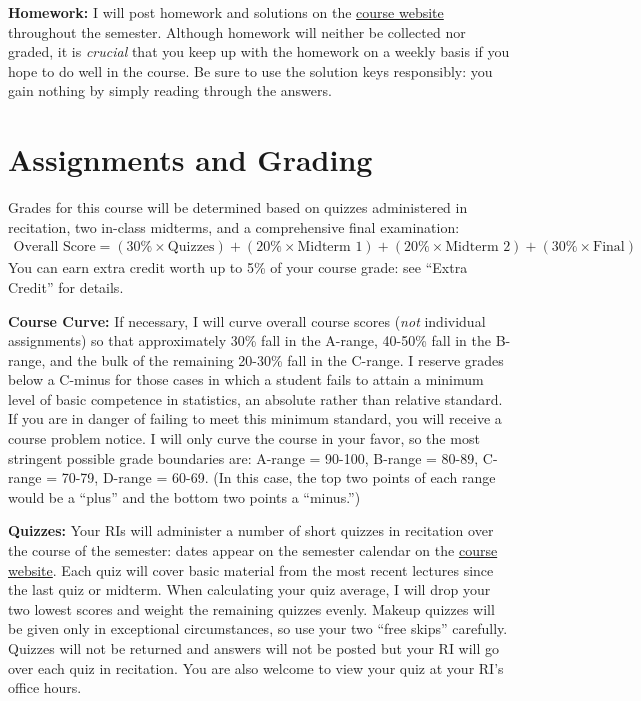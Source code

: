 \documentclass[11pt, letterpaper]{article}
\begin{document}
\medskip

\noindent \textbf{Homework:} 
I will post homework and solutions on the \href{http://ditraglia.com/Econ103Public}{course website} throughout the semester. 
Although homework will neither be collected nor graded, it is \emph{crucial} that you keep up with the homework on a weekly basis if you hope to do well in the course.
Be sure to use the solution keys responsibly: you gain nothing by simply reading through the answers.



\section*{Assignments and Grading}

Grades for this course will be determined based on quizzes administered in recitation, two in-class midterms, and a comprehensive final examination:
	\begin{equation*}
	\begin{split}
		\mbox{Overall Score} = (30\% \times \mbox{Quizzes})  + (20\% \times \mbox{Midterm 1}) + (20\% \times \mbox{Midterm 2}) + (30\% \times \mbox{Final})
	\end{split}
	\end{equation*}
You can earn extra credit worth up to 5\% of your course grade: see ``Extra Credit'' for details.

\medskip 

\noindent \textbf{Course Curve:}
If necessary, I will curve overall course scores (\emph{not} individual assignments) so that approximately 30\% fall in the A-range, 40-50\% fall in the B-range, and the bulk of the remaining 20-30\% fall in the C-range. 
I reserve grades below a C-minus for those cases in which a student fails to attain a minimum level of basic competence in statistics, an absolute rather than relative standard. 
If you are in danger of failing to meet this minimum standard, you will receive a course problem notice.
I will only curve the course in your favor, so the most stringent possible grade boundaries are: A-range = 90-100, B-range = 80-89, C-range = 70-79, D-range = 60-69.
(In this case, the top two points of each range would be a ``plus'' and the bottom two points a ``minus.'')

\medskip


\noindent \textbf{Quizzes:} 
Your RIs will administer a number of short quizzes in recitation over the course of the semester: dates appear on the semester calendar on the \href{http://ditraglia.com/Econ103Public}{course website}.
Each quiz will cover basic material from the most recent lectures since the last quiz or midterm. 
When calculating your quiz average, I will drop your two lowest scores and weight the remaining quizzes evenly. 
Makeup quizzes will be given only in exceptional circumstances, so use your two ``free skips'' carefully.
Quizzes will not be returned and answers will not be posted but your RI will go over each quiz in recitation.
You are also welcome to view your quiz at your RI's office hours.
\end{document}
